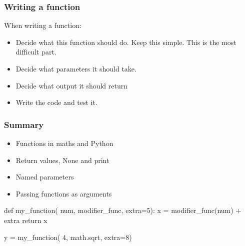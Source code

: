 \documentclass{beamer}
\begin{document}
\begin{frame}
\frametitle{Writing a function}
When writing a function:
\begin{itemize}
\item Decide what this function should do. Keep this simple. This is
  the most difficult part. 
\item Decide what parameters it should take.
\item Decide what output it should return
\item Write the code and test it.
\end{itemize}
\end{frame}

\begin{frame}[fragile]
\frametitle{Summary}
\begin{itemize}
\item Functions in maths and Python
\item Return values, None and print
\item Named parameters
\item Passing functions as arguments
\end{itemize}

\bigskip

\begin{code}
def my_function( num, modifier_func, extra=5):
   x = modifier_func(num) + extra
   return x

y = my_function( 4, math.sqrt, extra=8)
\end{code}
\end{frame}
\end{document}
